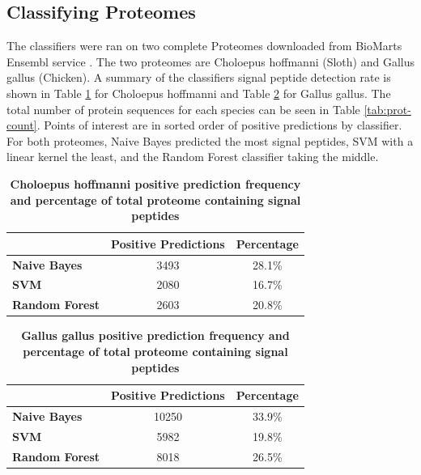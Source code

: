 \documentclass[10pt,letterpaper]{article}
\begin{document}
	\subsection*{Classifying Proteomes}
	The classifiers were ran on two complete Proteomes downloaded from BioMarts Ensembl service \cite{ensembl}. The two proteomes are Choloepus hoffmanni (Sloth) and Gallus gallus (Chicken). A summary of the classifiers signal peptide detection rate is shown in Table \ref{tab:sloth} for Choloepus hoffmanni and Table \ref{tab:chicken} for Gallus gallus. The total number of protein sequences for each species can be seen in Table \ref{tab:prot-count}. Points of interest are in sorted order of positive predictions by classifier. For both proteomes, Naive Bayes predicted the most signal peptides, SVM with a linear kernel the least, and the Random Forest classifier taking the middle. 
	
	\begin{table}[!ht]
		\centering
		\caption{{\bf Choloepus hoffmanni positive prediction frequency and percentage of total proteome containing signal peptides}}
		\label{tab:sloth}
		\begin{tabular}{@{}lcc@{}}
			\toprule
			& \multicolumn{1}{l}{Positive Predictions} & \multicolumn{1}{l}{Percentage} \\ \midrule
			\textbf{Naive Bayes}   & 3493                                     & 28.1\%                         \\
			\textbf{SVM}           & 2080                                     & 16.7\%                         \\
			\textbf{Random Forest} & 2603                                     & 20.8\%                        
		\end{tabular}
	\end{table}
	
	\begin{table}[!ht]
		\centering
		\caption{{\bf Gallus gallus positive prediction frequency and percentage of total proteome containing signal peptides}}
		\label{tab:chicken}
		\begin{tabular}{@{}lcc@{}}
			\toprule
			& \multicolumn{1}{l}{Positive Predictions} & \multicolumn{1}{l}{Percentage} \\ \midrule
			\textbf{Naive Bayes}   & 10250                                    & 33.9\%                         \\
			\textbf{SVM}           & 5982                                     & 19.8\%                         \\
			\textbf{Random Forest} & 8018                                     & 26.5\%                        
		\end{tabular}
	\end{table}
	
\end{document}
